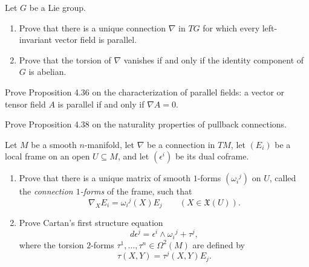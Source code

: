 \begin{exercise}
\label{prob:lie-group-connection}
Let $G$ be a Lie group.
\begin{enumerate}
\item[(a)] Prove that there is a unique connection $\nabla$ in $TG$ for which
every left-invariant vector field is parallel.
\item[(b)] Prove that the torsion of $\nabla$ vanishes if and only if the identity
component of $G$ is abelian.
\end{enumerate}
\end{exercise}

\begin{exercise}
\label{prob:parallel-tensor-fields}
Prove Proposition 4.36 on the characterization of parallel fields: a vector or
tensor field $A$ is parallel if and only if $\nabla A=0$.
\end{exercise}

\begin{exercise}
\label{prob:pullback-connections}
Prove Proposition 4.38 on the naturality properties of pullback connections.
\end{exercise}

\begin{exercise}
\label{prob:connection-1forms-cartan}
Let $M$ be a smooth $n$-manifold, let $\nabla$ be a connection in $TM$, let
$(E_i)$ be a local frame on an open $U\subseteq M$, and let $(\epsilon^i)$ be its
dual coframe.
\begin{enumerate}
\item[(a)] Prove that there is a unique matrix of smooth $1$-forms
$(\omega_i{}^j)$ on $U$, called the \emph{connection $1$-forms} of the frame,
such that
\[
\nabla_XE_i=\omega_i{}^j(X)E_j
\qquad(X\in\mathfrak X(U)).
\]
\item[(b)] Prove Cartan's first structure equation
\[
d\epsilon^j=\epsilon^i\wedge\omega_i{}^j+\tau^j,
\]
where the torsion $2$-forms $\tau^1,\ldots,\tau^n\in\Omega^2(M)$ are defined by
\[
\tau(X,Y)=\tau^j(X,Y)E_j.
\]
\end{enumerate}
\end{exercise}
